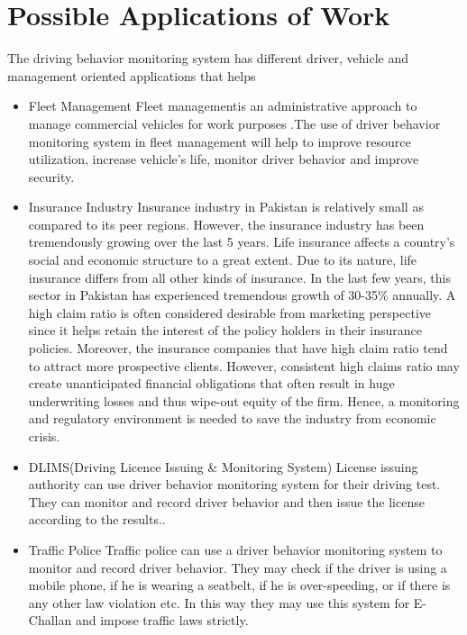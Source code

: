  \chapter{Possible Applications of Work}
 The driving behavior monitoring system has different driver, vehicle and management oriented applications that helps
 \begin{itemize}
     \item Fleet Management \newline
      Fleet managementis an administrative approach to manage commercial
vehicles for work purposes .The use of driver behavior monitoring system in fleet
management will help to improve resource utilization, increase vehicle’s life, monitor
driver behavior and improve security.
\item  Insurance Industry \newline
Insurance industry in Pakistan is relatively small as compared to its peer
regions. However, the insurance industry has been tremendously growing over the
last 5 years. Life insurance affects a country’s social and economic structure to a
great extent. Due to its nature, life insurance differs from all other kinds of insurance.
In the last few years, this sector in Pakistan has experienced tremendous growth of
30-35\% annually. A high claim ratio is often considered desirable from marketing
perspective since it helps retain the interest of the policy holders in their insurance
policies. Moreover, the insurance companies that have high claim ratio tend to attract
more prospective clients. However, consistent high claims ratio may create
unanticipated financial obligations that often result in huge underwriting losses and
thus wipe-out equity of the firm. Hence, a monitoring and regulatory environment is
needed to save the industry from economic crisis.
\item DLIMS(Driving Licence Issuing \& Monitoring System) \newline
License issuing authority can use driver behavior monitoring system for their
driving test. They can monitor and record driver behavior and then issue the
license according to the results..
\item Traffic Police \newline
Traffic police can use a driver behavior monitoring system to monitor and
record driver behavior. They may check if the driver is using a mobile phone, if he is
wearing a seatbelt, if he is over-speeding, or if there is any other law violation etc. In
this way they may use this system for E-Challan and impose traffic laws strictly.
 \end{itemize}
 
